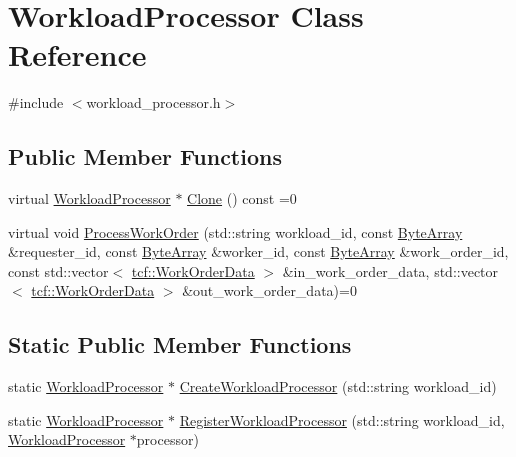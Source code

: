 \hypertarget{classWorkloadProcessor}{}\section{Workload\+Processor Class Reference}
\label{classWorkloadProcessor}


{\ttfamily \#include $<$workload\+\_\+processor.\+h$>$}

\subsection*{Public Member Functions}
\begin{DoxyCompactItemize}
\item 
virtual \hyperlink{classWorkloadProcessor}{Workload\+Processor} $\ast$ \hyperlink{classWorkloadProcessor_a2fd0e60c485994a16aa52c938be576e2}{Clone} () const =0
\item 
virtual void \hyperlink{classWorkloadProcessor_a62cdfb1a67991496856a32a33c1845fb}{Process\+Work\+Order} (std\+::string workload\+\_\+id, const \hyperlink{types_8h_a35da937e2331acce98d47f44892f4a76}{Byte\+Array} \&requester\+\_\+id, const \hyperlink{types_8h_a35da937e2331acce98d47f44892f4a76}{Byte\+Array} \&worker\+\_\+id, const \hyperlink{types_8h_a35da937e2331acce98d47f44892f4a76}{Byte\+Array} \&work\+\_\+order\+\_\+id, const std\+::vector$<$ \hyperlink{classtcf_1_1WorkOrderData}{tcf\+::\+Work\+Order\+Data} $>$ \&in\+\_\+work\+\_\+order\+\_\+data, std\+::vector$<$ \hyperlink{classtcf_1_1WorkOrderData}{tcf\+::\+Work\+Order\+Data} $>$ \&out\+\_\+work\+\_\+order\+\_\+data)=0
\end{DoxyCompactItemize}
\subsection*{Static Public Member Functions}
\begin{DoxyCompactItemize}
\item 
static \hyperlink{classWorkloadProcessor}{Workload\+Processor} $\ast$ \hyperlink{classWorkloadProcessor_aa0d3463d5ecf81ad6a7da65a417b1eaa}{Create\+Workload\+Processor} (std\+::string workload\+\_\+id)
\item 
static \hyperlink{classWorkloadProcessor}{Workload\+Processor} $\ast$ \hyperlink{classWorkloadProcessor_aa8912ff5f8a6037f999d6aa4f59d366f}{Register\+Workload\+Processor} (std\+::string workload\+\_\+id, \hyperlink{classWorkloadProcessor}{Workload\+Processor} $\ast$processor)
\end{DoxyCompactItemize}
